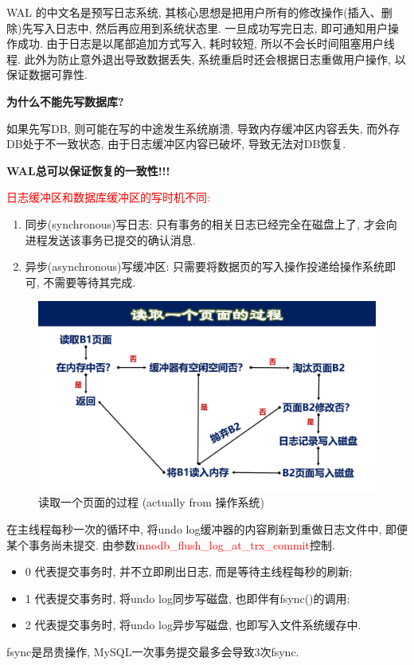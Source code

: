 WAL 的中文名是预写日志系统, 其核心思想是把用户所有的修改操作(插入、删除)先写入日志中, 
然后再应用到系统状态里. 
一旦成功写完日志, 即可通知用户操作成功. 
由于日志是以尾部追加方式写入, 耗时较短, 所以不会长时间阻塞用户线程.
此外为防止意外退出导致数据丢失, 系统重启时还会根据日志重做用户操作, 以保证数据可靠性.

\textbf{为什么不能先写数据库?}

如果先写DB, 则可能在写的中途发生系统崩溃, 导致内存缓冲区内容丢失,
而外存DB处于不一致状态, 由于日志缓冲区内容已破坏, 导致无法对DB恢复.

\textbf{WAL总可以保证恢复的一致性!!!}

\textcolor{red}{日志缓冲区和数据库缓冲区的写时机不同:}
\begin{enumerate}
    \item 同步(synchronous)写日志: 只有事务的相关日志已经完全在磁盘上了, 才会向进程发送该事务已提交的确认消息.
    \item 异步(asynchronous)写缓冲区: 只需要将数据页的写入操作投递给操作系统即可, 不需要等待其完成.
\end{enumerate}

\begin{figure}[H]
    \centering
    \includegraphics[width=.6\textwidth]{figure/读写页面.pdf}
    \caption{读取一个页面的过程 (actually from 操作系统)}
\end{figure}

在主线程每秒一次的循环中, 将undo log缓冲器的内容刷新到重做日志文件中, 即便某个事务尚未提交.
由参数\textcolor{red}{innodb\_flush\_log\_at\_trx\_commit}控制.
\begin{itemize}
    \item 0 代表提交事务时, 并不立即刷出日志, 而是等待主线程每秒的刷新;
    \item 1 代表提交事务时, 将undo log同步写磁盘, 也即伴有fsync()的调用;
    \item 2 代表提交事务时, 将undo log异步写磁盘, 也即写入文件系统缓存中.
\end{itemize}

fsync是昂贵操作, MySQL一次事务提交最多会导致3次fsync.

